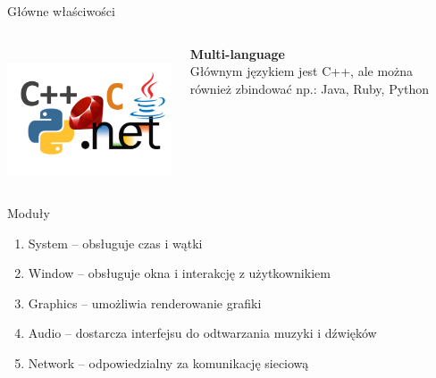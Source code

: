 \documentclass[12pt]{beamer}
\begin{document}
\begin{frame}[t]{Główne właściwości}
\begin{columns}
             \\[28pt]
            \includegraphics[scale=0.3]{textures/multilanguage.png} \\[20pt]
            \begin{center}
                \textbf{Multi-language} \\
                Głównym językiem jest C++, ale można również zbindować np.: Java, Ruby, Python
            \end{center}

        \end{columns}

    \end{frame}



    \begin{frame}[t]{Moduły}\vspace{10pt}

        \begin{enumerate}
            \item System – obsługuje czas i wątki
            \item Window – obsługuje okna i interakcję z użytkownikiem
            \item Graphics – umożliwia renderowanie grafiki
            \item Audio – dostarcza interfejsu do odtwarzania muzyki i dźwięków
            \item Network – odpowiedzialny za komunikację sieciową
        \end{enumerate}

    \end{frame}
\end{document}
